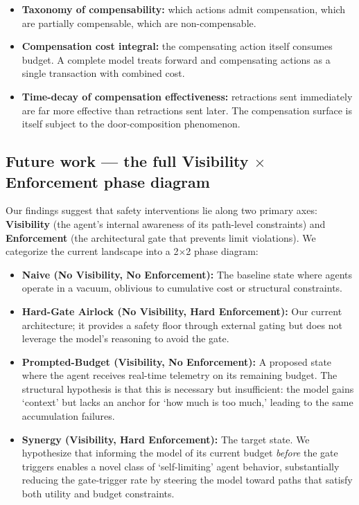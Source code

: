 \documentclass[11pt]{article}
\begin{document}
\begin{itemize}[leftmargin=*]
\item \textbf{Taxonomy of compensability:} which actions admit compensation, which are partially compensable, which are non-compensable.
\item \textbf{Compensation cost integral:} the compensating action itself consumes budget. A complete model treats forward and compensating actions as a single transaction with combined cost.
\item \textbf{Time-decay of compensation effectiveness:} retractions sent immediately are far more effective than retractions sent later. The compensation surface is itself subject to the door-composition phenomenon.
\end{itemize}

\subsection{Future work --- the full Visibility $\times$ Enforcement phase diagram}
\label{sec:phase-diagram}

Our findings suggest that safety interventions lie along two primary axes: \textbf{Visibility} (the agent's internal awareness of its path-level constraints) and \textbf{Enforcement} (the architectural gate that prevents limit violations). We categorize the current landscape into a 2$\times$2 phase diagram:

\begin{itemize}[leftmargin=*]
\item \textbf{Naive (No Visibility, No Enforcement):} The baseline state where agents operate in a vacuum, oblivious to cumulative cost or structural constraints.
\item \textbf{Hard-Gate Airlock (No Visibility, Hard Enforcement):} Our current architecture; it provides a safety floor through external gating but does not leverage the model's reasoning to avoid the gate.
\item \textbf{Prompted-Budget (Visibility, No Enforcement):} A proposed state where the agent receives real-time telemetry on its remaining budget. The structural hypothesis is that this is necessary but insufficient: the model gains `context' but lacks an anchor for `how much is too much,' leading to the same accumulation failures.
\item \textbf{Synergy (Visibility, Hard Enforcement):} The target state. We hypothesize that informing the model of its current budget \emph{before} the gate triggers enables a novel class of `self-limiting' agent behavior, substantially reducing the gate-trigger rate by steering the model toward paths that satisfy both utility and budget constraints.
\end{itemize}
\end{document}
